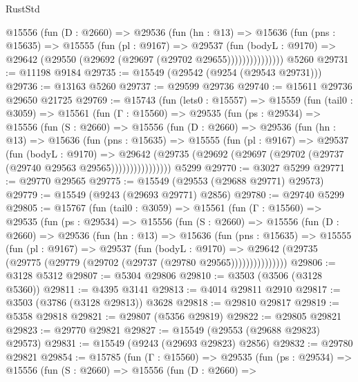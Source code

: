 \begin{lexlean}{RustStd}
\begin{coremodule}
              @15556
                (fun (D : @2660) =>
                @29536
                  (fun (hn : @13) =>
                  @15636
                    (fun (pns : @15635) =>
                    @15555
                      (fun (pl : @9167) =>
                      @29537
                        (fun (bodyL : @9170) =>
                        @29642 (@29550 (@29692 (@29697 (@29702 @29655)))))))))))))))
    @5260
@29731 := @11198 @9184
@29735 := @15549 (@29542 (@9254 (@29543 @29731)))
@29736 := @13163 @5260
@29737 := @29599 @29736
@29740 := @15611 @29736 @29650 @21725
@29769 := @15743
    (fun (lets0 : @15557) =>
    @15559
      (fun (tail0 : @3059) =>
      @15561
        (fun (Γ : @15560) =>
        @29535
          (fun (ps : @29534) =>
          @15556
            (fun (S : @2660) =>
            @15556
              (fun (D : @2660) =>
              @29536
                (fun (hn : @13) =>
                @15636
                  (fun (pns : @15635) =>
                  @15555
                    (fun (pl : @9167) =>
                    @29537
                      (fun (bodyL : @9170) =>
                      @29642
                        (@29735
                          (@29692 (@29697 (@29702 (@29737 (@29740 @29563 @29565))))))))))))))))
    @5299
@29770 := @3027 @5299
@29771 := @29770 @29565
@29775 := @15549 (@29553 (@29688 @29771) @29573)
@29779 := @15549 (@9243 (@29693 @29771) @2856)
@29780 := @29740 @5299
@29805 := @15767
    (fun (tail0 : @3059) =>
    @15561
      (fun (Γ : @15560) =>
      @29535
        (fun (ps : @29534) =>
        @15556
          (fun (S : @2660) =>
          @15556
            (fun (D : @2660) =>
            @29536
              (fun (hn : @13) =>
              @15636
                (fun (pns : @15635) =>
                @15555
                  (fun (pl : @9167) =>
                  @29537
                    (fun (bodyL : @9170) =>
                    @29642 (@29735 (@29775 (@29779 (@29702 (@29737 (@29780 @29565)))))))))))))))
@29806 := @3128 @5312
@29807 := @5304 @29806
@29810 := @3503 (@3506 (@3128 @5360))
@29811 := @4395 @3141
@29813 := @4014 @29811 @2910
@29817 := @3503 (@3786 (@3128 @29813)) @3628
@29818 := @29810 @29817
@29819 := @5358 @29818
@29821 := @29807 (@5356 @29819)
@29822 := @29805 @29821
@29823 := @29770 @29821
@29827 := @15549 (@29553 (@29688 @29823) @29573)
@29831 := @15549 (@9243 (@29693 @29823) @2856)
@29832 := @29780 @29821
@29854 := @15785
    (fun (Γ : @15560) =>
    @29535
      (fun (ps : @29534) =>
      @15556
        (fun (S : @2660) =>
        @15556
          (fun (D : @2660) =>

\end{coremodule}
\end{lexlean}
